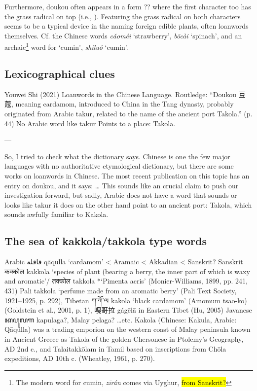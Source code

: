 \documentclass[12pt]{article}
\newcommand{\tc}[1]{\traditionalchinesefont{#1}\rmfamily}
\begin{document}
Furthermore, doukou often appears in a form ?? where the first character too has the grass radical on top (i.e., \tc{荳蔻}). Featuring the grass radical on both characters seems to be a typical device in the naming foreign edible plants, often loanwords themselves. Cf. the Chinese words \tc{草莓} \textit{cǎoméi} `strawberry', \tc{菠菜} \textit{bōcài} `spinach', and an archaic\footnote{The modern word for cumin, \tc{孜然} \textit{zī​rán} comes via Uyghur, \hl{from Sanskrit?}} word for `cumin', \tc{蒔蘿} \textit{shíluó} `cumin'.

\subsection{Lexicographical clues}

Youwei Shi (2021) Loanwords in the Chinese Language. Routledge:
	“Doukou 豆蔻, meaning cardamom, introduced to China in the 	Tang dynasty, probably originated from Arabic takur, related to 	the name of the ancient port Takola.” (p. 44)
No Arabic word like takur
Points to a place: Takola.

---

So, I tried to check what the dictionary says. Chinese is one the few major languages with no authoritative etymological dictionary, but there are some works on loanwords in Chinese. The most recent publication on this topic has an entry on doukou, and it says: 
…
This sounds like an crucial claim to push our investigation forward, 
but sadly, Arabic does not have a word that sounds or looks like takur
it does on the other hand point to an ancient port: Takola, which sounds awfully familiar to Kakola.





\subsection{The sea of kakkola/takkola type words}

Arabic قاقلة qāqulla ‘cardamom’ < Aramaic < Akkadian < Sanskrit?
Sanskrit कक्कोल kakkola ‘species of plant (bearing a berry, the inner part of which is waxy and aromatic’/ तक्कोल takkola *‘Pimenta acris’ (Monier-Williams, 1899, pp. 241, 431)
Pali takkola ‘perfume made from an aromatic berry’ (Pali Text Society, 1921–1925, p. 292),
Tibetan ཀ་ཀོ་ལ kakola ‘black cardamom’ (Amomum tsao-ko) (Goldstein et al., 2001, p. 1), 嘎哥拉 gágēlā in Eastern Tibet (Hu, 2005)
Javanese ꦏꦥꦸꦭꦒ kapulaga?, Malay pelaga? …etc.
Kakola (Chinese: Kakula, Arabic: Qāqulla) was a trading emporion on the western coast of Malay peninsula known in Ancient Greece as Takola of the golden Chersonese in Ptolemy’s Geography, AD 2nd c., and Talaitakkōlam in Tamil based on inscriptions from Chōla expeditions, AD 10th c. (Wheatley, 1961, p. 270).
\end{document}
